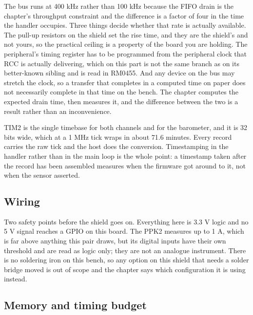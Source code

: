 The bus runs at 400 kHz rather than 100 kHz because the FIFO drain is the
chapter's throughput constraint and the difference is a factor of four in the
time the handler occupies. Three things decide whether that rate is actually
available. The pull-up resistors on the shield set the rise time, and they are
the shield's and not yours, so the practical ceiling is a property of the board
you are holding. The peripheral's timing register has to be programmed from the
peripheral clock that RCC is actually delivering, which on this part is not the
same branch as on its better-known sibling and is read in RM0455. And any device
on the bus may stretch the clock, so a transfer that completes in a computed
time on paper does not necessarily complete in that time on the bench. The
chapter computes the expected drain time, then measures it, and the difference
between the two is a result rather than an inconvenience.

TIM2 is the single timebase for both channels and for the barometer, and it is
32 bits wide, which at a 1 MHz tick wraps in about 71.6 minutes. Every record
carries the raw tick and the host does the conversion. Timestamping in the
handler rather than in the main loop is the whole point: a timestamp taken after
the record has been assembled measures when the firmware got around to it, not
when the sensor asserted.

\subsection*{Wiring}


Two safety points before the shield goes on. Everything here is 3.3 V logic and
no 5 V signal reaches a GPIO on this board. The PPK2 measures up to 1 A, which
is far above anything this pair draws, but its digital inputs have their own
threshold and are read as logic only; they are not an analogue instrument. There
is no soldering iron on this bench, so any option on this shield that needs a
solder bridge moved is out of scope and the chapter says which configuration it
is using instead.

\subsection*{Memory and timing budget}

